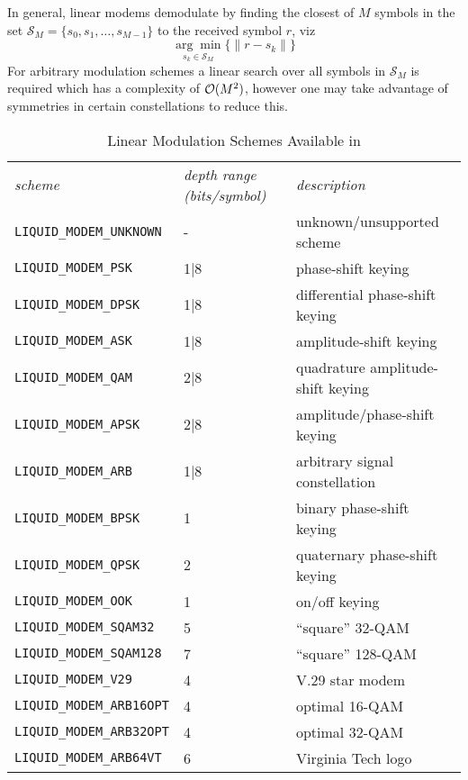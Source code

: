 In general, linear modems demodulate by finding the closest of $M$
symbols in the set $\mathcal{S}_M = \{s_0,s_1,\ldots,s_{M-1}\}$ 
to the received symbol $r$, viz
%
\begin{equation}
\label{eqn:modem:demod}
    \underset{s_k \in \mathcal{S}_M}{\arg\min}
    \bigl\{
        \| r - s_k \|
    \bigr\}
\end{equation}
%
For arbitrary modulation schemes a linear search over all symbols in
$\mathcal{S}_M$ is required which has a complexity of $\mathcal{O}(M^2)$, however one may
take advantage of symmetries in certain constellations to reduce this.

\begin{table*}
\caption{Linear Modulation Schemes Available in \liquid}
\label{tab:modem:schemes}
\centering
{\small
\begin{tabular*}{0.95\textwidth}{l@{\extracolsep{\fill}}ll}
\toprule
{\it scheme} &
{\it depth range (bits/symbol)} &
{\it description}\\\otoprule
%
{\tt LIQUID\_MODEM\_UNKNOWN}    & -     & unknown/unsupported scheme\\
{\tt LIQUID\_MODEM\_PSK}        & 1|8   & phase-shift keying\\
{\tt LIQUID\_MODEM\_DPSK}       & 1|8   & differential phase-shift keying\\
{\tt LIQUID\_MODEM\_ASK}        & 1|8   & amplitude-shift keying\\
{\tt LIQUID\_MODEM\_QAM}        & 2|8   & quadrature amplitude-shift keying\\
{\tt LIQUID\_MODEM\_APSK}       & 2|8   & amplitude/phase-shift keying\\
{\tt LIQUID\_MODEM\_ARB}        & 1|8   & arbitrary signal constellation\\\midrule
%
{\tt LIQUID\_MODEM\_BPSK}       & 1     & binary phase-shift keying\\
{\tt LIQUID\_MODEM\_QPSK}       & 2     & quaternary phase-shift keying\\
{\tt LIQUID\_MODEM\_OOK}        & 1     & on/off keying\\
{\tt LIQUID\_MODEM\_SQAM32}     & 5     & ``square'' 32-QAM\\
{\tt LIQUID\_MODEM\_SQAM128}    & 7     & ``square'' 128-QAM\\
{\tt LIQUID\_MODEM\_V29}        & 4     & V.29 star modem\\
{\tt LIQUID\_MODEM\_ARB16OPT}   & 4     & optimal 16-QAM\\
{\tt LIQUID\_MODEM\_ARB32OPT}   & 4     & optimal 32-QAM\\
{\tt LIQUID\_MODEM\_ARB64VT}    & 6     & Virginia Tech logo\\\bottomrule
% 
\end{tabular*}
}
\end{table*}%


